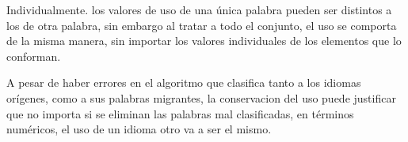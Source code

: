 Individualmente. los valores de uso de una única palabra pueden ser distintos a los de otra palabra, sin embargo al tratar a todo el conjunto, el uso se comporta de la misma manera, sin importar los valores individuales de los elementos que lo conforman. 

A pesar de haber errores en el algoritmo que clasifica tanto a los idiomas orígenes, como a sus  palabras migrantes, la conservacion del uso puede justificar que no importa si se eliminan las palabras mal clasificadas, en términos numéricos, el uso de un idioma otro va a ser el mismo.  

